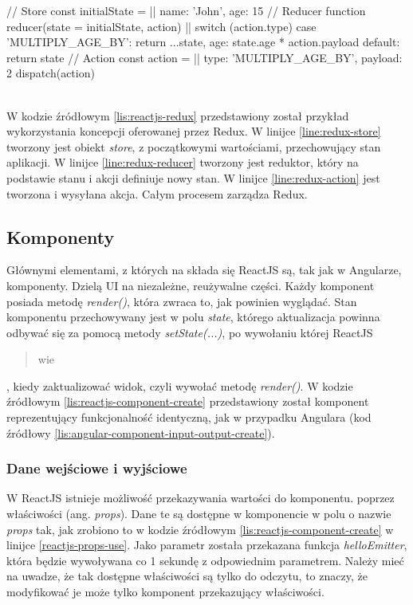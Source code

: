 	 \begin{code}[
		language=javascript,
		caption={Przykład użycia Redux (źródło: opracowanie własne)},
		label={lis:reactjs-redux},
		escapechar=|
	]
// Store
const initialState = { |\label{line:redux-store}|
  name: 'John',
  age: 15
}
// Reducer
function reducer(state = initialState, action) { |\label{line:redux-reducer}|
  switch (action.type) {
    case 'MULTIPLY_AGE_BY':
      return {
        ...state,
        age: state.age * action.payload
      }
    default:
      return state
  }
}
// Action
const action = { |\label{line:redux-action}|
  type: 'MULTIPLY_AGE_BY',
  payload: 2
}
dispatch(action)

	\end{code}\\
	
	W kodzie źródłowym \ref{lis:reactjs-redux} przedstawiony został przykład wykorzystania  koncepcji oferowanej przez Redux. W linijce \ref{line:redux-store} tworzony jest obiekt \textit{store}, z początkowymi wartościami, przechowujący stan aplikacji. W linijce \ref{line:redux-reducer} tworzony jest reduktor, który na podstawie stanu i akcji definiuje nowy stan. W linijce \ref{line:redux-action} jest tworzona i wysyłana akcja. Całym procesem zarządza Redux.
	 
	 \subsection{Komponenty}
	 Głównymi elementami, z których na składa się ReactJS są, tak jak w Angularze, komponenty. Dzielą UI na niezależne, reużywalne części. Każdy komponent posiada metodę \textit{render()}, która zwraca to, jak powinien wyglądać. Stan komponentu przechowywany jest w polu \textit{state}, którego aktualizacja powinna odbywać się za pomocą metody \textit{setState({...})}, po wywołaniu której ReactJS \blockquote{wie}, kiedy zaktualizować widok, czyli wywołać metodę \textit{render()}. W kodzie źródłowym \ref{lis:reactjs-component-create} przedstawiony został komponent reprezentujący funkcjonalność identyczną, jak w przypadku Angulara (kod źródłowy \ref{lis:angular-component-input-output-create}).
	 
	 \subsubsection{Dane wejściowe i wyjściowe}  
	 W ReactJS istnieje możliwość przekazywania wartości do komponentu. poprzez właściwości (ang. \textit{props}). Dane te są dostępne w komponencie w polu o nazwie \textit{props} tak, jak zrobiono to w kodzie źródłowym \ref{lis:reactjs-component-create} w linijce \ref{reactjs-props-use}. Jako parametr została przekazana funkcja \textit{helloEmitter}, która będzie wywoływana co 1 sekundę z odpowiednim parametrem. Należy mieć na uwadze, że tak dostępne właściwości są tylko do odczytu, to znaczy, że modyfikować je może tylko komponent przekazujący właściwości.
	 

